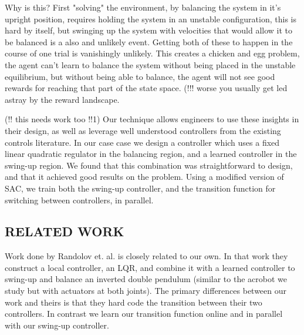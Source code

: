 \documentclass[letterpaper, 10 pt, conference]{ieeeconf}
\begin{document}
Why is this? First "solving" the environment, by balancing the system in it's upright position, requires holding the system in an unstable configuration, this is hard by itself, but swinging up the system with velocities that would allow it to be balanced is a also and unlikely event. Getting both of these to happen in the course of one trial is vanishingly unlikely. This creates a chicken and egg problem, the agent can't learn to balance the system without being placed in the unstable equilibrium, but without being able to balance, the agent will not see good rewards for reaching that part of the state space. (!!! worse  you usually get led astray by the reward landscape.

(!! this needs work too !!1) 
 Our technique allows engineers to use these insights in their design, as well as leverage well understood controllers from the existing controls literature. In our case  case we design a controller which uses a fixed linear quadratic regulator in the balancing region, and a learned controller in the swing-up region. We found that this combination was straightforward to design, and that it achieved good results on the problem.  Using a modified version of SAC, we train both the swing-up controller, and the transition function for switching between controllers, in parallel. 






\subsection{RELATED WORK}

Work done by Randolov et. al. \cite{randlov_combining_2000} is closely related to our own. In that work they construct a local controller, an LQR, and combine it with a learned controller to swing-up and balance an inverted double pendulum (similar to the acrobot we study but with actuators at both joints). The primary differences between our work and theirs is that they hard code the transition between their two controllers. In contrast we learn our transition function online and in parallel with our swing-up controller.


\end{document}
